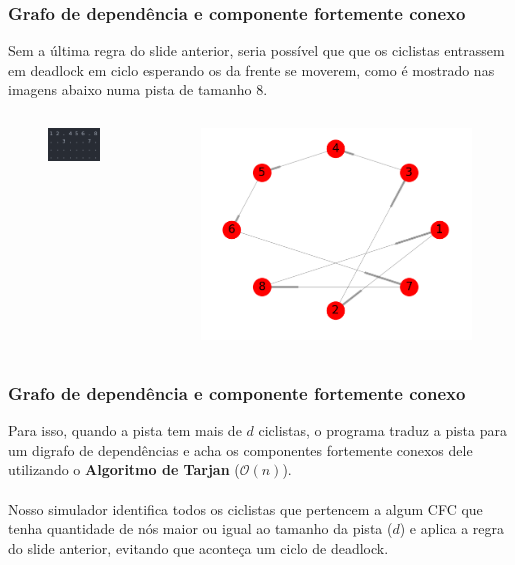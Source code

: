 \documentclass{beamer}
\begin{document}
\begin{frame}
\frametitle{Grafo de dependência e componente fortemente conexo}
Sem a última regra do slide anterior, seria possível que que os ciclistas entrassem em deadlock em ciclo esperando os da frente se moverem, como é mostrado nas imagens abaixo numa pista de tamanho 8.
\begin{columns}[c]
\begin{figure}
\includegraphics[scale=0.6]{loop_example.png}
\end{figure}
\begin{figure}
\includegraphics[scale=0.25]{depend_graph.png}
\end{figure}
\end{columns}
\end{frame}

\begin{frame}
\frametitle{Grafo de dependência e componente fortemente conexo}
Para isso, quando a pista tem mais de $d$ ciclistas, o programa traduz a pista para um digrafo de dependências e acha os componentes fortemente conexos dele utilizando o \textbf{Algoritmo de Tarjan} ($\mathcal{O}(n)$).
\\~\\
Nosso simulador identifica todos os ciclistas que pertencem a algum CFC que tenha quantidade de nós maior ou igual ao tamanho da pista ($d$) e aplica a regra do slide anterior, evitando que aconteça um ciclo de deadlock.
\end{frame}
\end{document}
